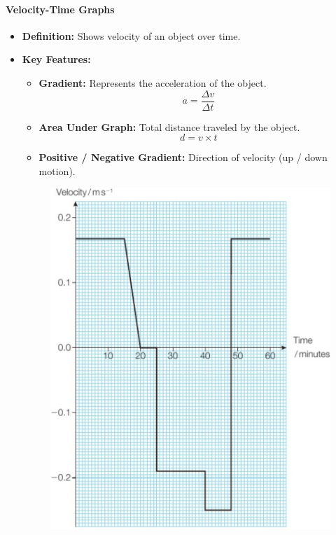 \paragraph{Velocity-Time Graphs}
\begin{itemize}
    \item \textbf{Definition:} Shows velocity of an object over time.
    \item \textbf{Key Features:}
    \begin{itemize}
        \item \textbf{Gradient:} Represents the acceleration of the object.
        \begin{equation}
            a = \frac{\Delta v}{\Delta t}
        \end{equation}
        \item \textbf{Area Under Graph:} Total distance traveled by the object.
        \begin{equation}
            d = v \times t
        \end{equation}
        \item \textbf{Positive / Negative Gradient:} Direction of velocity (up / down motion).
    \end{itemize}
    \begin{figure}[H]
        \centering
        \includegraphics[scale=0.15]{Physics/1A/Images/1A-2-2.png}

\end{figure}
\end{itemize}
